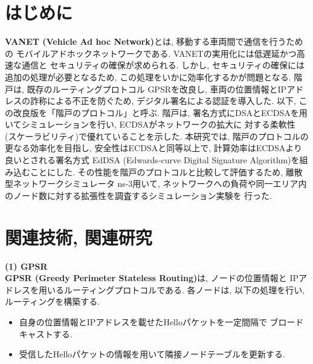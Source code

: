 \documentclass[a4j,9pt,twocolumn]{jsarticle}
\begin{document}
\pagestyle{empty} %

\section{はじめに}
\textbf{VANET (Vehicle Ad hoc Network)}とは, 移動する車両間で通信を行うための
モバイルアドホックネットワークである. VANETの実用化には低遅延かつ高速な通信と
セキュリティの確保が求められる. しかし, セキュリティの確保には追加の処理が必要となるため, 
この処理をいかに効率化するかが問題となる. 階戸\cite{shinato}は, 既存のルーティングプロトコル
GPSRを改良し, 車両の位置情報とIPアドレスの詐称による不正を防ぐため, 
デジタル署名による認証を導入した. 以下, この改良版を「階戸のプロトコル」と呼ぶ. 
階戸は, 署名方式にDSAとECDSAを用いてシミュレーションを行い, ECDSAがネットワークの拡大に
対する柔軟性 (スケーラビリティ)で優れていることを示した. 本研究では, 階戸のプロトコルの
更なる効率化を目指し, 安全性はECDSAと同等以上で, 計算効率はECDSAより良いとされる署名方式
EdDSA (Edwards-curve Digital Signature Algorithm)を組み込むことにした.  
その性能を階戸のプロトコルと比較して評価するため, 離散型ネットワークシミュレータ ns-3用いて, 
ネットワークへの負荷や同一エリア内のノード数に対する拡張性を調査するシミュレーション実験を
行った. 
\section{関連技術, 関連研究}
\noindent \textbf{(1) GPSR}\\
\indent \textbf{GPSR (Greedy Perimeter Stateless Routing)}\cite{gpsr}は, ノードの位置情報と
IPアドレスを用いるルーティングプロトコルである. 各ノードは, 以下の処理を行い, 
ルーティングを構築する. 
\begin{itemize}
\item 自身の位置情報とIPアドレスを載せたHelloパケットを一定間隔で
ブロードキャストする.
\item 受信したHelloパケットの情報を用いて隣接ノードテーブルを更新する.
\end{itemize}
\end{document}
